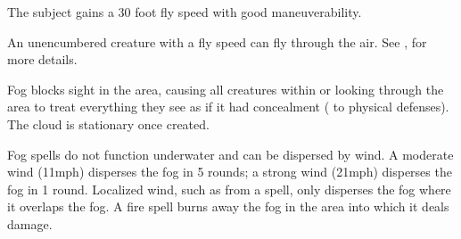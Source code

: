 \spellrng{\rngtouch}
\spelldur{\durshort}
\begin{spelleffect}
    The subject gains a 30 foot fly speed with good maneuverability.
\end{spelleffect}
\begin{spellnotes}
    An unencumbered creature with a fly speed can fly through the air. See , for more details.
\end{spellnotes}

\spellrng{\rngmed}
\spelldur{\durshort}
\begin{spelleffect}
    Fog blocks sight in the area, causing all creatures within or looking through the area to treat everything they see as if it had concealment ( to physical defenses). The cloud is stationary once created.
\end{spelleffect}
\begin{spellnotes}
    Fog spells do not function underwater and can be dispersed by wind. A moderate wind (11\add mph) disperses the fog in 5 rounds; a strong wind (21\add mph) disperses the fog in 1 round. Localized wind, such as from a  spell, only disperses the fog where it overlaps the fog. A fire spell burns away the fog in the area into which it deals damage.
\end{spellnotes}

